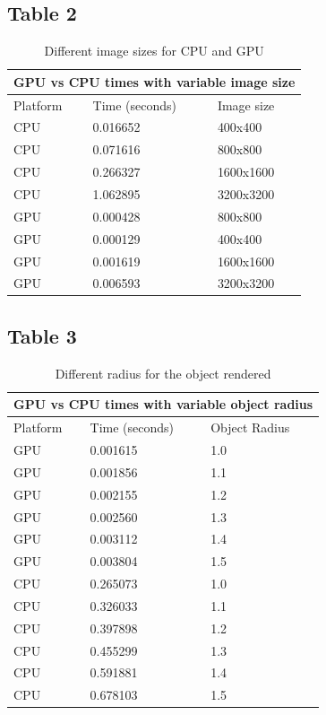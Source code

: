\documentclass[english]{exam}
\begin{document}
\subsection*{Table 2}
\begin{table}[H]
  \centering
  \begin{tabular}{ |p{4cm}||p{4cm}|p{4cm}|  }
    \hline
    \multicolumn{3}{|c|}{GPU vs CPU times with variable image size} \\
    \hline
    Platform & Time (seconds)& Image size\\
    \hline
    CPU & 0.016652 & 400x400\\
    CPU & 0.071616 & 800x800\\
    CPU & 0.266327 & 1600x1600\\
    CPU & 1.062895 & 3200x3200\\
    GPU& 0.000428& 800x800\\
    GPU& 0.000129& 400x400\\
    GPU& 0.001619& 1600x1600\\
    GPU& 0.006593& 3200x3200\\
    \hline
  \end{tabular}
  \caption{Different image sizes for CPU and GPU}
  \label{tab:2}
\end{table}

\subsection*{Table 3}
\begin{table}[H]
  \centering
  \begin{tabular}{ |p{4cm}||p{4cm}|p{4cm}|  }
    \hline
    \multicolumn{3}{|c|}{GPU vs CPU times with variable object radius} \\
    \hline
    Platform & Time (seconds)& Object Radius\\
    \hline
    GPU& 0.001615& 1.0\\
    GPU& 0.001856& 1.1\\
    GPU& 0.002155& 1.2\\
    GPU& 0.002560& 1.3\\
    GPU& 0.003112& 1.4\\
    GPU& 0.003804& 1.5\\
    
    CPU& 0.265073& 1.0\\
    CPU& 0.326033& 1.1\\    
    CPU& 0.397898& 1.2\\
    CPU& 0.455299& 1.3\\
    CPU& 0.591881& 1.4\\
    CPU& 0.678103& 1.5\\
    \hline
  \end{tabular}
  \caption{Different radius for the object rendered}
  \label{tab:3}
\end{table}
\end{document}
